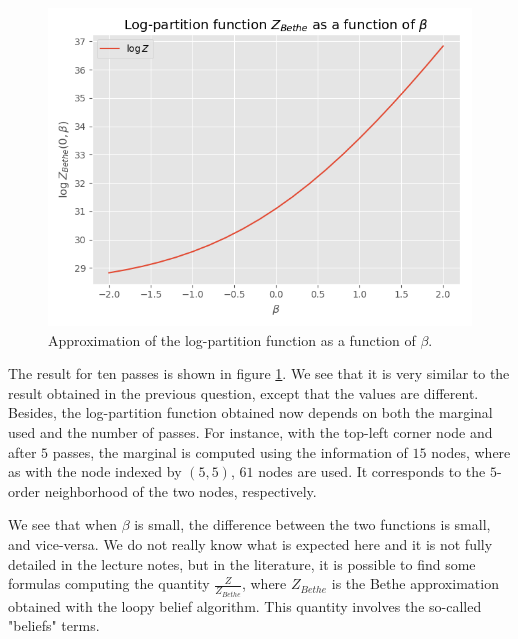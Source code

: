 \documentclass[a4paper, 11pt]{report}
\begin{document}
\begin{enumerate}[resume]
    \begin{figure}[h]
        \centering
        \includegraphics[scale=.5]{images/approx_log_partition_beta.png}
        \caption{Approximation of the log-partition function as a function of $\beta$.}
        \label{fig:approx-log-partition}
    \end{figure}
    
    The result for ten passes is shown in figure \ref{fig:approx-log-partition}. We see that it is very similar to the result obtained in the previous question, except that the values are different. Besides, the log-partition function obtained now depends on both the marginal used and the number of passes. For instance, with the top-left corner node and after $5$ passes, the marginal is computed using the information of $15$ nodes, where as with the node indexed by $(5, 5)$, $61$ nodes are used. It corresponds to the $5$-order neighborhood of the two nodes, respectively.
    
    We see that when $\beta$ is small, the difference between the two functions is small, and vice-versa. We do not really know what is expected here and it is not fully detailed in the lecture notes, but in the literature, it is possible to find some formulas computing the quantity $\frac{Z}{Z_{Bethe}}$, where $Z_{Bethe}$ is the Bethe approximation obtained with the loopy belief algorithm. This quantity involves the so-called "beliefs" terms.
\end{enumerate}
\end{document}

